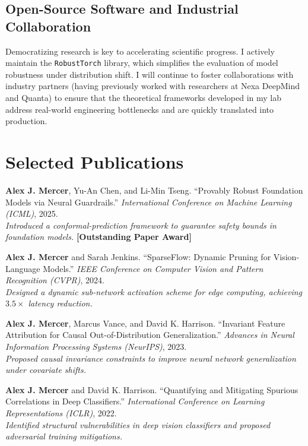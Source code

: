 \documentclass[10pt,a4paper]{article}
\begin{document}
\subsection{Open-Source Software and Industrial Collaboration}
Democratizing research is key to accelerating scientific progress. I actively maintain the \texttt{RobustTorch} library, which simplifies the evaluation of model robustness under distribution shift. I will continue to foster collaborations with industry partners (having previously worked with researchers at Nexa DeepMind and Quanta) to ensure that the theoretical frameworks developed in my lab address real-world engineering bottlenecks and are quickly translated into production.

\section{Selected Publications}
\begin{enumerate}[label={\textbf{[\arabic*]}}, leftmargin=*, itemsep=0.4em]
  \item \textbf{Alex J. Mercer}, Yu-An Chen, and Li-Min Tseng. ``Provably Robust Foundation Models via Neural Guardrails.'' \emph{International Conference on Machine Learning (ICML)}, 2025. \\
  \textit{Introduced a conformal-prediction framework to guarantee safety bounds in foundation models.} \hfill \color{accent}\textbf{[Outstanding Paper Award]}
  
  \item \textbf{Alex J. Mercer} and Sarah Jenkins. ``SparseFlow: Dynamic Pruning for Vision-Language Models.'' \emph{IEEE Conference on Computer Vision and Pattern Recognition (CVPR)}, 2024. \\
  \textit{Designed a dynamic sub-network activation scheme for edge computing, achieving $3.5\times$ latency reduction.}
  
  \item \textbf{Alex J. Mercer}, Marcus Vance, and David K. Harrison. ``Invariant Feature Attribution for Causal Out-of-Distribution Generalization.'' \emph{Advances in Neural Information Processing Systems (NeurIPS)}, 2023. \\
  \textit{Proposed causal invariance constraints to improve neural network generalization under covariate shifts.}
  
  \item \textbf{Alex J. Mercer} and David K. Harrison. ``Quantifying and Mitigating Spurious Correlations in Deep Classifiers.'' \emph{International Conference on Learning Representations (ICLR)}, 2022. \\
  \textit{Identified structural vulnerabilities in deep vision classifiers and proposed adversarial training mitigations.}
\end{enumerate}
\end{document}
